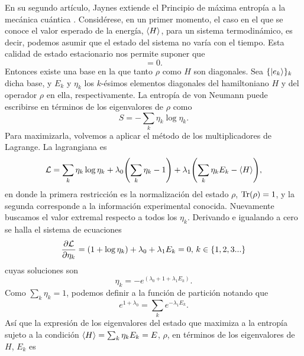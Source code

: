 

En su segundo artículo, Jaynes extiende el Principio de máxima entropía a la mecánica cuántica \cite{JaynesII}. Considérese, en un primer momento, el caso en el que se conoce el valor esperado de la energía, $\expval{H}$, para un sistema termodinámico, es decir, podemos asumir que el estado del sistema no varía con el tiempo. Esta calidad de estado estacionario nos permite suponer que
\begin{equation}
    [\rho,H]=0.\nonumber
\end{equation}
Entonces existe una base en la que tanto $\rho$ como $H$ son diagonales. Sea $\{\ket{e_{k}}\}_{k}$ dicha base, y $E_{k}$ y $\eta_{k}$ los $k$-ésimos elementos diagonales del hamiltoniano $H$ y del operador $\rho$ en ella, respectivamente. La entropía de von Neumann puede escribirse en términos de los eigenvalores de $\rho$ como
\begin{equation}
    S=-\sum_{k}\eta_{k}\log{\eta_{k}}.\nonumber
\end{equation}
Para maximizarla, volvemos a aplicar el método de los multiplicadores de Lagrange. La lagrangiana es
\begin{equation}
    \mathcal{L}=\sum_{k}\eta_{k}\log{\eta_{k}}+\lambda_{0}\qty(\sum_{k}\eta_{k}-1)+\lambda_{1}\qty(\sum_{k}\eta_{k}E_{k}-\expval{H}),\nonumber
\end{equation}
en donde la primera restricción es la normalización del estado $\rho$, $\Tr(\rho)=1$, y la segunda corresponde a la información experimental conocida. Nuevamente buscamos el valor extremal respecto a todos los $\eta_{k}$. Derivando e igualando a cero se halla el sistema de ecuaciones
\begin{equation}
    \frac{\partial \mathcal{L}}{\partial \eta_{k}}=(1+\log{\eta_{k}})+\lambda_{0}+\lambda_{1}E_{k}=0, \,k\in\{1,2,3...\}\nonumber
\end{equation}
cuyas soluciones son
\begin{equation}
    \eta_{k}=-e^{(\lambda_{0}+1+\lambda_{1}E_{k})}.\nonumber
\end{equation}
Como $\sum_{k}\eta_{k}=1$, podemos definir a la función de partición notando que
\begin{equation}
    e^{1+\lambda_{0}}=\sum_{k}e^{-\lambda_{1}E_{k}}.\nonumber
\end{equation}
Así que la expresión de los eigenvalores del estado que maximiza a la entropía sujeto a la condición $\expval{H}=\sum_{k}\eta_{k}E_{k}=E$, $\rho$, en términos de los eigenvalores de $H$, $E_{k}$ es
